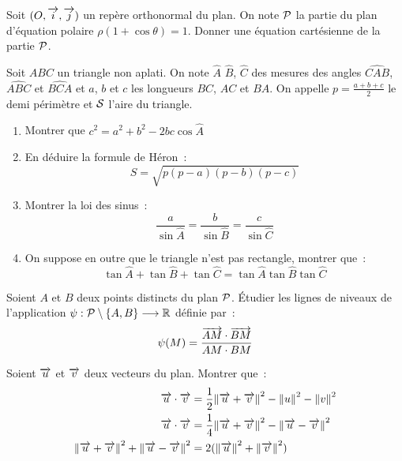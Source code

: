 \begin{exercice}
  Soit \((O, \vi, \vj)\) un repère orthonormal du plan. On note
  \(\P\) la partie du plan d'équation polaire \(\rho(1 +
  \cos\theta) = 1\). Donner une équation cartésienne de la partie
  \(\P\).
\end{exercice}

\begin{exercice}
  Soit \(ABC\) un triangle non aplati. On note \(\hat{A}\)
  \(\hat{B}\), \(\hat{C}\) des mesures des angles
  \(\widehat{CAB}\), \(\widehat{ABC}\) et \(\widehat{BCA}\) et
  \(a\), \(b\) et \(c\) les longueurs \(BC\), \(AC\) et \(BA\). On
  appelle \(p = \frac{a + b + c}{2} \) le demi périmètre et \(\S\)
  l'aire du triangle.
  \begin{enumerate}
    \item Montrer que \(c^2 = a^2 + b^2 - 2bc\cos \hat{A}\)
    \item En déduire la formule de Héron~:
      \begin{equation}
        S = \sqrt{p(p - a)(p - b)(p - c)}
      \end{equation}
    \item Montrer la loi des sinus~:
      \begin{equation}
        \frac{a}{\sin \hat{A}} = \frac{b}{\sin \hat{B}} =
        \frac{c}{\sin \hat{C}}
      \end{equation}
    \item On suppose en outre que le triangle n'est pas rectangle,
      montrer que~:
      \begin{equation}
        \tan \hat{A} + \tan \hat{B} + \tan \hat{C} = \tan \hat{A}
        \tan \hat{B} \tan\hat{C}
      \end{equation}
  \end{enumerate}
\end{exercice}

\begin{exercice}
  Soient \(A\) et \(B\) deux points distincts du plan \(\P\).
  Étudier les lignes de niveaux de l'application
  \(\fonctionR{\psi}{\P\setminus\{A, B\}}{\R}\) définie par~:
  \begin{equation}
    \psi(M) = \frac{\vect{AM}\cdot\vect{BM}}{AM \cdot BM}
  \end{equation}
\end{exercice}

\begin{exercice}
  Soient \(\vu\) et \(\vv\) deux vecteurs du plan. Montrer que~:
  \begin{align}
    \vu \cdot \vv &= \frac{1}{2}{\norme{\vu + \vv}^2 - \norme{u}^2
    - \norme{v}^2} \\
      \vu \cdot \vv &= \frac{1}{4}{\norme{\vu + \vv}^2 -
      \norme{\vu - \vv}^2} \\
        \norme{\vu + \vv}^2 + \norme{\vu - \vv}^2 &=
        2(\norme{\vu}^2 + \norme{\vv}^2)
  \end{align}
\end{exercice}

